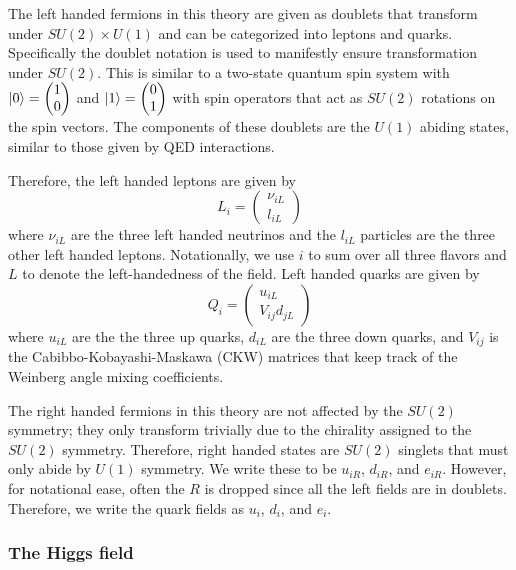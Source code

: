 The left handed fermions in this theory are given as doublets that transform under $SU(2) \times U(1)$ and can be categorized into leptons and quarks. Specifically the doublet notation is used to manifestly ensure transformation under $SU(2)$. This is similar to a two-state quantum spin system with $\ket{0} = \begin{pmatrix} 1 \\ 0 \end{pmatrix}$ and $\ket{1} = \begin{pmatrix} 0 \\ 1 \end{pmatrix}$ with spin operators that act as $SU(2)$ rotations on the spin vectors. The components of these doublets are the $U(1)$ abiding states, similar to those given by QED interactions.

Therefore, the left handed leptons are given by
\begin{equation}
L_{i} = \begin{pmatrix}
\nu_{iL} \\ l_{iL}
\end{pmatrix}
\end{equation}
where $\nu_{iL}$ are the three left handed neutrinos and the $l_{iL}$ particles are the three other left handed leptons. Notationally, we use $i$ to sum over all three flavors and $L$ to denote the left-handedness of the field. Left handed quarks are given by
\begin{equation}
Q_{i} = \begin{pmatrix}
u_{iL} \\ V_{ij} d_{jL}
\end{pmatrix}
\end{equation}
where $u_{iL}$ are the the three up quarks, $d_{iL}$ are the three down quarks, and $V_{ij}$ is the Cabibbo-Kobayashi-Maskawa (CKW) matrices that keep track of the Weinberg angle mixing coefficients.

The right handed fermions in this theory are not affected by the $SU(2)$ symmetry; they only transform trivially due to the chirality assigned to the $SU(2)$ symmetry. Therefore, right handed states are $SU(2)$ singlets that must only abide by $U(1)$ symmetry. We write these to be $u_{iR}$, $d_{iR}$, and $e_{iR}$. However, for notational ease, often the $R$ is dropped since all the left fields are in doublets. Therefore, we write the quark fields as $u_{i}$, $d_{i}$, and $e_{i}$.

\subsubsection{The Higgs field}

